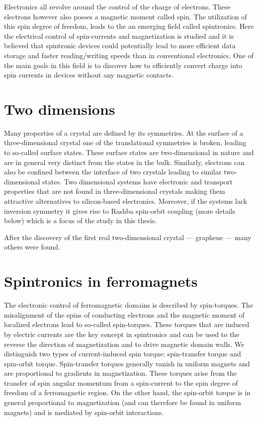 Electronics all revolve around the control of the charge of electrons. These electrons however also posses a magnetic moment called spin. The utilization of this spin degree of freedom, leads to the an emerging field called spintronics. Here the electrical control of spin-currents and magnetization is studied and it is believed that spintronic devices could potentially lead to more efficient data storage and faster reading/writing speeds than in conventional electronics. One of the main goals in this field is to discover how to efficiently convert charge into spin currents in devices without any magnetic contacts. 


\section{Two dimensions}
Many properties of a crystal are defined by its symmetries. At the surface of a three-dimensional crystal one of the translational symmetries is broken, leading to so-called surface states. These surface states are two-dimensional in nature and are in general very distinct from the states in the bulk. Similarly, electrons can also be confined between the interface of two crystals leading to similar two-dimensional states. Two dimensional systems have electronic and transport properties that are not found in three-dimensional crystals making them attractive alternatives to silicon-based electronics. Moreover, if the systems lack inversion symmetry it gives rise to Rashba spin-orbit coupling (more details below) which is a focus of the study in this thesis. 

After the discovery of the first real two-dimensional crystal --- graphene --- many others were found. 
\section{Spintronics in ferromagnets}
The electronic control of ferromagnetic domains is described by spin-torques. The misalignment of the spins of conducting electrons and the magnetic moment of localized electrons lead to so-called spin-torques. These torques that are induced by electric currents are the key concept in spintronics and can be used to the reverse the direction of magnetization and to drive magnetic domain walls. We distinguish two types of current-induced spin torque: spin-transfer torque and spin-orbit torque. Spin-transfer torques generally vanish in uniform magnets and are proportional to gradients in magnetization. These torques arise from the transfer of spin angular momentum from a spin-current to the spin degree of freedom of a ferromagnetic region.  On the other hand, the spin-orbit torque is in general proportional to magnetization (and can therefore be found in uniform magnets) and is mediated by spin-orbit interactions. 

